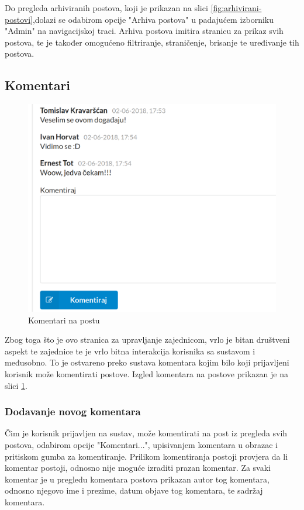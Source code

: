 \documentclass[zavrsni, numeric]{fer}
\begin{document}
Do pregleda arhiviranih postova, koji je prikazan na slici \ref{fig:arhivirani-postovi},dolazi se odabirom opcije "Arhiva postova" u padajućem izborniku "Admin" na navigacijskoj traci. Arhiva postova imitira stranicu za prikaz svih postova, te je također omogućeno filtriranje, straničenje, brisanje te uređivanje tih postova.

\subsection{Komentari}	

\begin{figure}[H]
	\centering
	\includegraphics[width=13cm]{slike/komentari.png}
	\caption{Komentari na postu}
	\label{fig:komentari}
\end{figure}

Zbog toga što je ovo stranica za upravljanje zajednicom, vrlo je bitan društveni aspekt te zajednice te je vrlo bitna interakcija korisnika sa sustavom i međusobno. To je ostvareno preko sustava komentara kojim bilo koji prijavljeni korisnik može komentirati postove. Izgled komentara na postove prikazan je na slici \ref{fig:komentari}.

\subsubsection{Dodavanje novog komentara}

Čim je korisnik prijavljen na sustav, može komentirati na post iz pregleda svih postova, odabirom opcije "Komentari...", upisivanjem komentara u obrazac i pritiskom gumba za komentiranje. Prilikom komentiranja postoji provjera da li komentar postoji, odnosno nije moguće izraditi prazan komentar. Za svaki komentar je u pregledu komentara postova prikazan autor tog komentara, odnosno njegovo ime i prezime, datum objave tog komentara, te sadržaj komentara.
\end{document}
